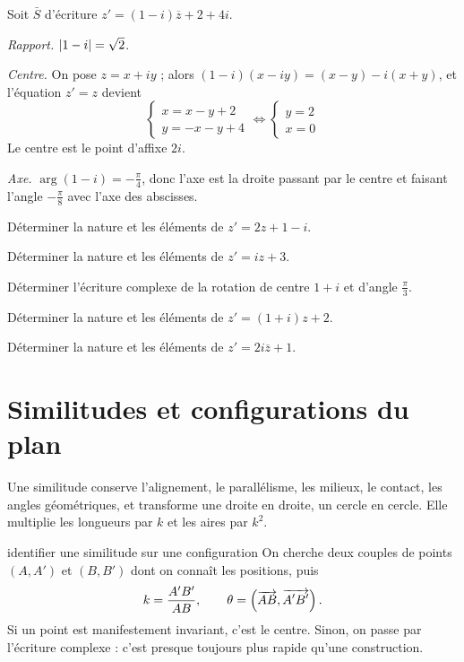 \begin{exemple}
Soit $\bar S$ d'écriture $z' = (1-i)\overline z+2+4i$.

\emph{Rapport.} $\left|1-i\right| = \sqrt2$.

\emph{Centre.} On pose $z = x+iy$ ; alors
$(1-i)(x-iy) = (x-y)-i(x+y)$, et l'équation $z' = z$ devient
\[
  \begin{cases} x = x-y+2 \\ y = -x-y+4 \end{cases}
  \iff
  \begin{cases} y = 2 \\ x = 0 \end{cases}
\]
Le centre est le point d'affixe $2i$.

\emph{Axe.} $\arg(1-i) = -\frac{\pi}{4}$, donc l'axe est la droite passant par
le centre et faisant l'angle $-\frac{\pi}{8}$ avec l'axe des abscisses.
\end{exemple}

\begin{entrainement}
\exo[\niveau{1}] Déterminer la nature et les éléments de $z' = 2z+1-i$.

\exo[\niveau{1}] Déterminer la nature et les éléments de $z' = iz+3$.

\exo[\niveau{2}] Déterminer l'écriture complexe de la rotation de centre
$1+i$ et d'angle $\frac{\pi}{3}$.

\exo[\niveau{2}] Déterminer la nature et les éléments de
$z' = (1+i)z+2$.

\exo[\niveau{3}] Déterminer la nature et les éléments de
$z' = 2i\overline z+1$.
\end{entrainement}

\section{Similitudes et configurations du plan}

\begin{propriete}
Une similitude conserve l'alignement, le parallélisme, les milieux, le
contact, les angles géométriques, et transforme une droite en droite, un
cercle en cercle. Elle multiplie les longueurs par $k$ et les aires par
$k^{2}$.
\end{propriete}

\begin{methode}{identifier une similitude sur une configuration}
On cherche deux couples de points $(A,A')$ et $(B,B')$ dont on connaît les
positions, puis
\[
  k = \frac{A'B'}{AB},
  \qquad
  \theta = \left(\overrightarrow{AB},\overrightarrow{A'B'}\right).
\]
Si un point est manifestement invariant, c'est le centre. Sinon, on passe par
l'écriture complexe : c'est presque toujours plus rapide qu'une construction.
\end{methode}


